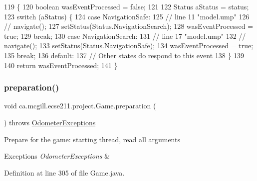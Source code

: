 \begin{DoxyCode}
119                                      \{
120     \textcolor{keywordtype}{boolean} wasEventProcessed = \textcolor{keyword}{false};
121 
122     Status aStatus = status;
123     \textcolor{keywordflow}{switch} (aStatus) \{
124       \textcolor{keywordflow}{case} NavigationSafe:
125         \textcolor{comment}{// line 11 "model.ump"}
126         \textcolor{comment}{// navigate();}
127         setStatus(Status.NavigationSearch);
128         wasEventProcessed = \textcolor{keyword}{true};
129         \textcolor{keywordflow}{break};
130       \textcolor{keywordflow}{case} NavigationSearch:
131         \textcolor{comment}{// line 17 "model.ump"}
132         \textcolor{comment}{// navigate();}
133         setStatus(Status.NavigationSafe);
134         wasEventProcessed = \textcolor{keyword}{true};
135         \textcolor{keywordflow}{break};
136       \textcolor{keywordflow}{default}:
137         \textcolor{comment}{// Other states do respond to this event}
138     \}
139 
140     \textcolor{keywordflow}{return} wasEventProcessed;
141   \}
\end{DoxyCode}
\mbox{\label{enumca_1_1mcgill_1_1ecse211_1_1project_1_1_game_a8f3c5b18f98ee56f5f03afd72fa40bcb}} 
\subsubsection{\texorpdfstring{preparation()}{preparation()}}
{\footnotesize\ttfamily void ca.\+mcgill.\+ecse211.\+project.\+Game.\+preparation (\begin{DoxyParamCaption}{ }\end{DoxyParamCaption}) throws \hyperlink{classca_1_1mcgill_1_1ecse211_1_1odometer_1_1_odometer_exceptions}{Odometer\+Exceptions}}

Prepare for the game\+: starting thread, read all arguments


\begin{DoxyExceptions}{Exceptions}
{\em Odometer\+Exceptions} & \\
\hline
\end{DoxyExceptions}


Definition at line 305 of file Game.\+java.



